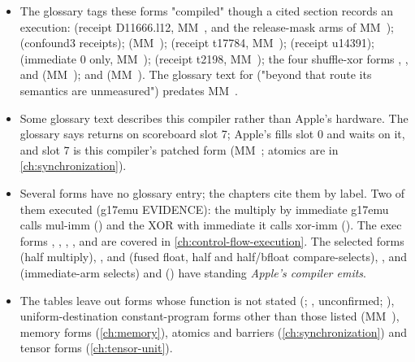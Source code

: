 \begin{itemize}
\item The glossary tags these forms "compiled" though a cited section records
  an execution:  (receipt D11666.l12, MM~, and the release-mask arms of MM~);
   (confound3 receipts);  (MM~);
   (receipt t17784, MM~);  (receipt u14391);  (immediate 0 only, MM~);  (receipt
  t2198, MM~); the four shuffle-xor forms , ,  and  (MM~); and
   (MM~). The glossary text for  ("beyond that route its semantics are
  unmeasured") predates MM~.
\item Some glossary text describes this compiler rather than Apple's hardware. The glossary says  returns on scoreboard slot 7; Apple's  fills slot 0 and waits on it, and slot 7 is this compiler's
  patched form (MM~; atomics are in \cref{ch:synchronization}).
\item Several forms have no glossary entry; the chapters cite them by label. Two of them executed (g17emu EVIDENCE): the
  multiply by immediate g17emu calls mul-imm () and the XOR with immediate it calls xor-imm (). The
  exec forms , , , ,  and  are covered in \cref{ch:control-flow-execution}.
  The selected forms  (half multiply), ,  and
   (fused float, half and half/bfloat compare-selects), ,  and  (immediate-arm selects) and
   () have standing \emph{Apple's compiler emits}.
\item The tables leave out forms whose function is not stated (; , unconfirmed; ), uniform-destination
  constant-program forms other than those listed (MM~), memory forms (\cref{ch:memory}), atomics and barriers (\cref{ch:synchronization}) and
  tensor forms (\cref{ch:tensor-unit}).
\end{itemize}
